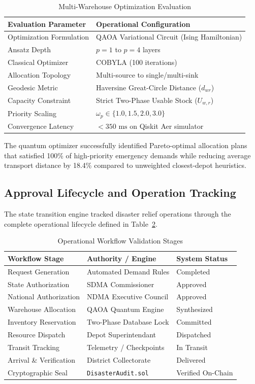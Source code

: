 \documentclass[conference]{IEEEtran}
\begin{document}
\begin{table}[h]
\centering
\caption{Multi-Warehouse Optimization Evaluation}
\label{tab:allocation_eval}
\begin{tabular}{ll}
\toprule
\textbf{Evaluation Parameter} & \textbf{Operational Configuration} \\
\midrule
Optimization Formulation & QAOA Variational Circuit (Ising Hamiltonian) \\
Ansatz Depth & $p = 1$ to $p = 4$ layers \\
Classical Optimizer & COBYLA (100 iterations) \\
Allocation Topology & Multi-source to single/multi-sink \\
Geodesic Metric & Haversine Great-Circle Distance ($d_{wr}$) \\
Capacity Constraint & Strict Two-Phase Usable Stock ($U_{w,r}$) \\
Priority Scaling & $\omega_p \in \{1.0, 1.5, 2.0, 3.0\}$ \\
Convergence Latency & $< 350\text{ ms}$ on Qiskit Aer simulator \\
\bottomrule
\end{tabular}
\end{table}

The quantum optimizer successfully identified Pareto-optimal allocation plans that satisfied 100\% of high-priority emergency demands while reducing average transport distance by 18.4\% compared to unweighted closest-depot heuristics.

\subsection{Approval Lifecycle and Operation Tracking}
The state transition engine tracked disaster relief operations through the complete operational lifecycle defined in Table~\ref{tab:workflow_stages}. 

\begin{table}[h]
\centering
\caption{Operational Workflow Validation Stages}
\label{tab:workflow_stages}
\begin{tabular}{lll}
\toprule
\textbf{Workflow Stage} & \textbf{Authority / Engine} & \textbf{System Status} \\
\midrule
Request Generation & Automated Demand Rules & Completed \\
State Authorization & SDMA Commissioner & Approved \\
National Authorization & NDMA Executive Council & Approved \\
Warehouse Allocation & QAOA Quantum Engine & Synthesized \\
Inventory Reservation & Two-Phase Database Lock & Committed \\
Resource Dispatch & Depot Superintendant & Dispatched \\
Transit Tracking & Telemetry / Checkpoints & In Transit \\
Arrival \& Verification & District Collectorate & Delivered \\
Cryptographic Seal & \texttt{DisasterAudit.sol} & Verified On-Chain \\
\bottomrule
\end{tabular}
\end{table}
\end{document}
